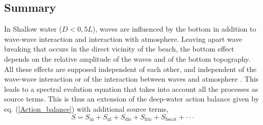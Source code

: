 \subsection{Summary}
In Shallow water ($D <0,5 L$), waves are influenced by the bottom in addition
to wave-wave interaction and interaction with atmosphere. Leaving apart wave breaking
that occurs in the direct vicinity of the beach, the bottom effect depends on the 
relative amplitude of the waves and of the bottom topography. All these effects
are supposed independent of each other, and independent of the wave-wave interaction
or of the interaction between waves and atmosphere \citep[e.g.][]{WAMBook}. 
This leads to a spectral evolution equation that takes
into account all the processes as source terms. This is thus an extension of 
the deep-water action balance given by eq. (\ref{Action_balance}) with additional source terms, 
\begin{equation}
S=S_{\mathrm{in}}+S_{\mathrm{nl}}+S_{\mathrm{dis}}+S_{\mathrm{fric}}
    +S_{\mathrm{bscat}}+ \cdot \cdot \cdot
\end{equation}

